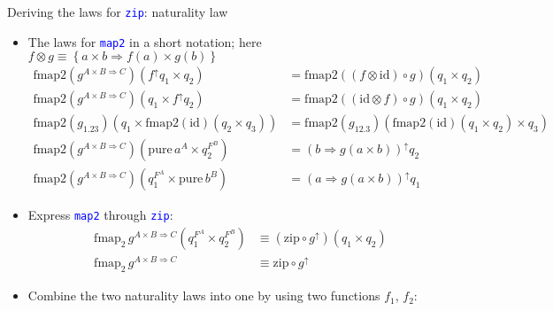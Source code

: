 \documentclass[english]{beamer}
\begin{document}
\begin{frame}{Deriving the laws for \texttt{\textcolor{blue}{\footnotesize{}zip}}:
naturality law}
\begin{itemize}
\item \vspace{-0.2cm}The laws for \texttt{\textcolor{blue}{\footnotesize{}map2}}
in a short notation; here{\footnotesize{} $f\otimes g\equiv\left\{ a\times b\Rightarrow f(a)\times g(b)\right\} $}
{\footnotesize{}
\begin{align*}
\text{fmap2}\left(g^{A\times B\Rightarrow C}\right)\left(f^{\uparrow}q_{1}\times q_{2}\right) & =\text{fmap2}\left(\left(f\otimes\text{id}\right)\circ g\right)\left(q_{1}\times q_{2}\right)\\
\text{fmap2}\left(g^{A\times B\Rightarrow C}\right)\left(q_{1}\times f^{\uparrow}q_{2}\right) & =\text{fmap2}\left(\left(\text{id}\otimes f\right)\circ g\right)\left(q_{1}\times q_{2}\right)\\
\text{fmap2}\left(g_{1.23}\right)\left(q_{1}\times\text{fmap2}\left(\text{id}\right)\left(q_{2}\times q_{3}\right)\right) & =\text{fmap2}\left(g_{12.3}\right)\left(\text{fmap2}\left(\text{id}\right)\left(q_{1}\times q_{2}\right)\times q_{3}\right)\\
\text{fmap2}\left(g^{A\times B\Rightarrow C}\right)\left(\text{pure}\,a^{A}\times q_{2}^{F^{B}}\right) & =\left(b\Rightarrow g\left(a\times b\right)\right)^{\uparrow}q_{2}\\
\text{fmap2}\left(g^{A\times B\Rightarrow C}\right)\left(q_{1}^{F^{A}}\times\text{pure}\,b^{B}\right) & =\left(a\Rightarrow g\left(a\times b\right)\right)^{\uparrow}q_{1}
\end{align*}
}{\footnotesize \par}
\item Express \texttt{\textcolor{blue}{\footnotesize{}map2}} through \texttt{\textcolor{blue}{\footnotesize{}zip}}:{\footnotesize{}
\begin{align*}
\text{fmap}_{2}\,g^{A\times B\Rightarrow C}\left(q_{1}^{F^{A}}\times q_{2}^{F^{B}}\right) & \equiv\left(\text{zip}\circ g^{\uparrow}\right)\left(q_{1}\times q_{2}\right)\\
\text{fmap}_{2}\,g^{A\times B\Rightarrow C} & \equiv\text{zip}\circ g^{\uparrow}
\end{align*}
}{\footnotesize \par}
\item Combine the two naturality laws into one by using two functions $f_{1}$,
$f_{2}$:{\footnotesize{}
\begin{align*}

\end{align*}}
\end{itemize}
\end{frame}
\end{document}
